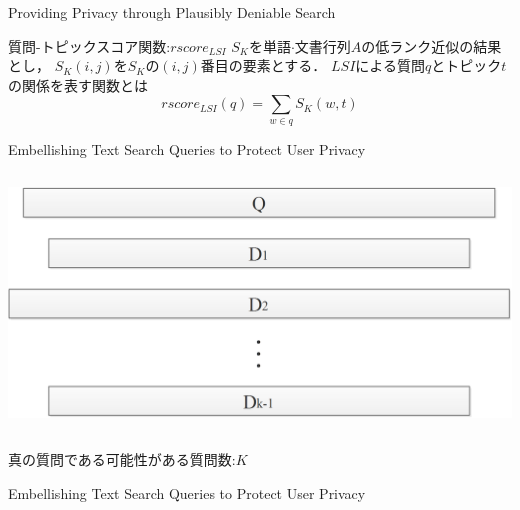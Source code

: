 \documentclass[14pt,xcolor=dvipsnames,table,dvipdfmx]{beamer}
\begin{document}
\begin{frame}{Providing Privacy through Plausibly Deniable Search \cite{providing2009}}
	\begin{block}{質問-トピックスコア関数:$rscore_{LSI}$}
		$S_K$を単語$\cdot$文書行列$A$の低ランク近似の結果とし，
		$S_K(i,j)$を$S_K$の$(i,j)$番目の要素とする．
		$LSI$による質問$q$とトピック$t$の関係を表す関数とは
		\begin{equation}
			rscore_{LSI}(q) = \sum_{w \in q}S_K(w,t)
		\end{equation}
	\end{block}
\end{frame}

\begin{frame}{Embellishing Text Search Queries to Protect User Privacy \cite{embellishing2010}}
	\begin{columns}[t]
		\begin{column}{0.8\textwidth} %
			\includegraphics[width=\columnwidth]{rk6.png}
		\end{column}
	\end{columns}
	\begin{block}{}
		真の質問である可能性がある質問数:$K$	
	\end{block}
\end{frame}

\begin{frame}{Embellishing Text Search Queries to Protect User Privacy \cite{embellishing2010}}
	\begin{block}{}
	\end{block}
\end{frame}
\end{document}
